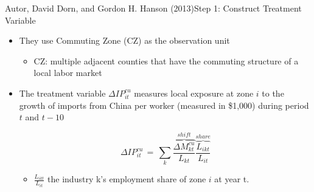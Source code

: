 \documentclass[dvipsnames,hyperref={pdfpagelabels=false}]{beamer}
\begin{document}
\begin{frame}{Autor, David Dorn, and Gordon H. Hanson (2013)}{Step 1: Construct Treatment Variable}
	\begin{itemize}
		\item They use Commuting Zone (CZ) as the observation unit
							\vspace{0.2cm}
			\begin{itemize}
		\item 	CZ: multiple adjacent counties that have the commuting structure of a local labor market
									\vspace{0.2cm}
	\end{itemize}

\item The treatment variable $\Delta I P_{it}^{c u}$ measures local exposure at zone $i$ to the growth
of imports from China per worker (measured in \$1,000) during period $t$ and $t-10$



\[ \Delta I P_{it}^{c u}\,=\,\sum_{k}\overbrace{\frac{\Delta M_{kt}^{cu}}{L_{kt}}}^{shift}\overbrace{\frac{L_{i k t}}{L_{i t}}}^{share} \]
	\begin{itemize}
		
										\vspace{0.2cm}
		\item $\frac{L_{ikt}}{L_{it}}$ the industry k's employment share of zone $i$ at year t.
											\vspace{0.2cm}
											
	\end{itemize}
	\end{itemize}
\end{frame}
\end{document}
